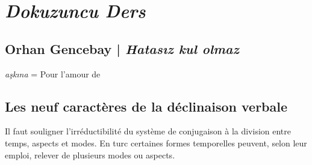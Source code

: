 \documentclass{cours}
\newcommand{\ch}{\c{s}}
\begin{document}
\section{\textsl{Dokuzuncu Ders}}
\subsection{Orhan Gencebay | \textsl{Hatas\i z kul olmaz}}
\textsl{a\ch k\i na} = Pour l'amour de
\subsection{Les neuf caractères de la déclinaison verbale}
Il faut souligner l'irréductibilité du système de conjugaison à la division entre temps, aspects et modes. En turc certaines formes temporelles peuvent, selon leur emploi, relever de plusieurs modes ou aspects.
\end{document}
